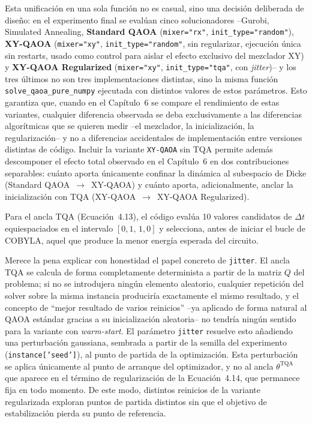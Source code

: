 Esta unificación en una sola función no es casual, sino una decisión deliberada de diseño: en el experimento final se evalúan cinco solucionadores --Gurobi, Simulated Annealing, \textbf{Standard QAOA} (\texttt{mixer="rx"}, \texttt{init\_type="random"}), \textbf{XY-QAOA} (\texttt{mixer="xy"}, \texttt{init\_type="random"}, sin regularizar, ejecución única sin restarts, usado como control para aislar el efecto exclusivo del mezclador XY) y \textbf{XY-QAOA Regularized} (\texttt{mixer="xy"}, \texttt{init\_type="tqa"}, con \textit{jitter})-- y los tres últimos no son tres implementaciones distintas, sino la misma función \texttt{solve\_qaoa\_pure\_numpy} ejecutada con distintos valores de estos parámetros. Esto garantiza que, cuando en el Capítulo~6 se compare el rendimiento de estas variantes, cualquier diferencia observada se deba exclusivamente a las diferencias algorítmicas que se quieren medir --el mezclador, la inicialización, la regularización-- y no a diferencias accidentales de implementación entre versiones distintas de código. Incluir la variante \texttt{XY-QAOA} sin TQA permite además descomponer el efecto total observado en el Capítulo~6 en dos contribuciones separables: cuánto aporta únicamente confinar la dinámica al subespacio de Dicke (Standard QAOA~$\rightarrow$~XY-QAOA) y cuánto aporta, adicionalmente, anclar la inicialización con TQA (XY-QAOA~$\rightarrow$~XY-QAOA Regularized).

Para el ancla TQA (Ecuación~4.13), el código evalúa 10 valores candidatos de $\Delta t$ equiespaciados en el intervalo $[0{,}1,\, 1{,}0]$ y selecciona, antes de iniciar el bucle de COBYLA, aquel que produce la menor energía esperada del circuito.

Merece la pena explicar con honestidad el papel concreto de \texttt{jitter}. El ancla TQA se calcula de forma completamente determinista a partir de la matriz $Q$ del problema; si no se introdujera ningún elemento aleatorio, cualquier repetición del solver sobre la misma instancia produciría exactamente el mismo resultado, y el concepto de ``mejor resultado de varios reinicios'' --ya aplicado de forma natural al QAOA estándar gracias a su inicialización aleatoria-- no tendría ningún sentido para la variante con \textit{warm-start}. El parámetro \texttt{jitter} resuelve esto añadiendo una perturbación gaussiana, sembrada a partir de la semilla del experimento (\texttt{instance['seed']}), al punto de partida de la optimización. Esta perturbación se aplica únicamente al punto de arranque del optimizador, y no al ancla $\theta^{\text{TQA}}$ que aparece en el término de regularización de la Ecuación~4.14, que permanece fija en todo momento. De este modo, distintos reinicios de la variante regularizada exploran puntos de partida distintos sin que el objetivo de estabilización pierda su punto de referencia.

